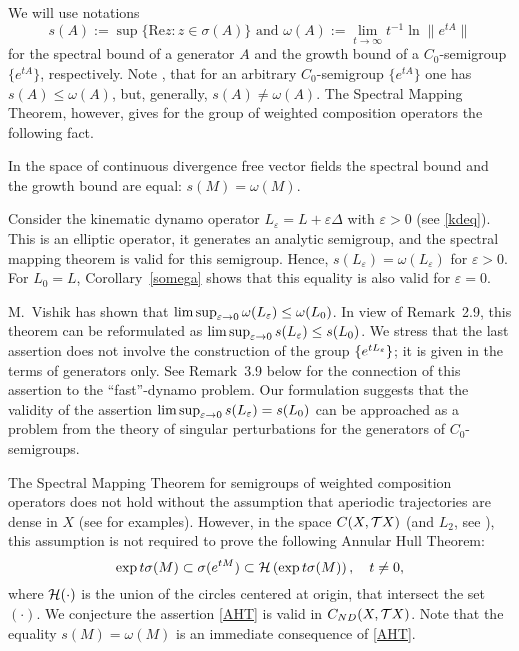 We will use notations
$$s(A):=\sup\{
\text{Re} z: z\in\sigma(A)\} \text{ and }
\omega(A):=\lim_{t\to\infty}t^{-1}\ln\|e^{tA}\|$$
for the spectral bound of
a generator $A$ and the growth bound of a $C_0$-semigroup
$\{e^{tA}\}$, respectively. Note \cite{Pazy}, that for an arbitrary
$C_0$-semigroup $\{e^{tA}\}$ one has $s(A)\leq \omega(A)$, but,
generally, $s(A)\neq \omega(A)$. The Spectral Mapping Theorem,
however, gives for the group of weighted composition operators the
following fact.
\begin{cor} \label{somega} In the space of continuous
divergence free vector fields the spectral bound and the growth bound
are equal: $s(M)=\omega(M)$.
\end{cor}

 Consider the kinematic dynamo operator
$L_\varepsilon=L+\varepsilon\Delta$ with $\varepsilon>0$ (see
\eqref{kdeq}). This is an elliptic operator, it generates an
analytic semigroup, and the spectral mapping theorem is
valid \cite{Pazy} for this semigroup. Hence,
$s(L_\varepsilon)=\omega(L_\varepsilon)$ for $\varepsilon>0$. For
$L_0=L$,  Corollary~\ref{somega} shows that this equality is also
valid for $\varepsilon=0$.

 M.~Vishik \cite{Vishik} has shown that
$\limsup_{\varepsilon\to 0}\omega(L_\varepsilon)\leq \omega(L_0)$. In view of
Remark~2.9, this theorem can be reformulated as
$\limsup_{\varepsilon\to 0}s(L_\varepsilon)\leq s(L_0)$. We stress that
the last assertion does not involve the construction of the group
$\{e^{tL_\varepsilon}\}$; it is given in the terms of generators only.
See Remark~3.9 below for the connection of this assertion
to the ``fast''-dynamo problem. Our formulation suggests
that the validity of the assertion
$\limsup_{\varepsilon\to 0}s(L_\varepsilon)= s(L_0)$
can be approached as a problem from the theory
of singular perturbations for the generators of
$C_0$-semigroups.

 The Spectral Mapping Theorem for
semigroups of weighted composition operators does not hold without
the assumption that aperiodic trajectories are dense in $X$ (see
\cite{CS,LS} for examples). However, in the
space ${C(X,{{\cal{T}}X})}$ (and $L_2$, see  \cite{CS,LS}), this assumption is not
required to prove the following Annular
Hull Theorem:
\begin{equation}\label{AHT}
\exp t \sigma(M)\subset \sigma(e^{tM}) \subset {\cal H}\left(\exp t
\sigma(M)\right), \quad t\neq 0,
\end{equation}
where ${\cal H}(\cdot )$ is the union of the circles centered at
origin, that intersect the set $(\cdot )$. We conjecture the
assertion \eqref{AHT} is valid in ${C_{ND}(X,{{\cal{T}}X})}$. Note that the equality
$s(M)=\omega(M)$ is an immediate consequence of \eqref{AHT}.

